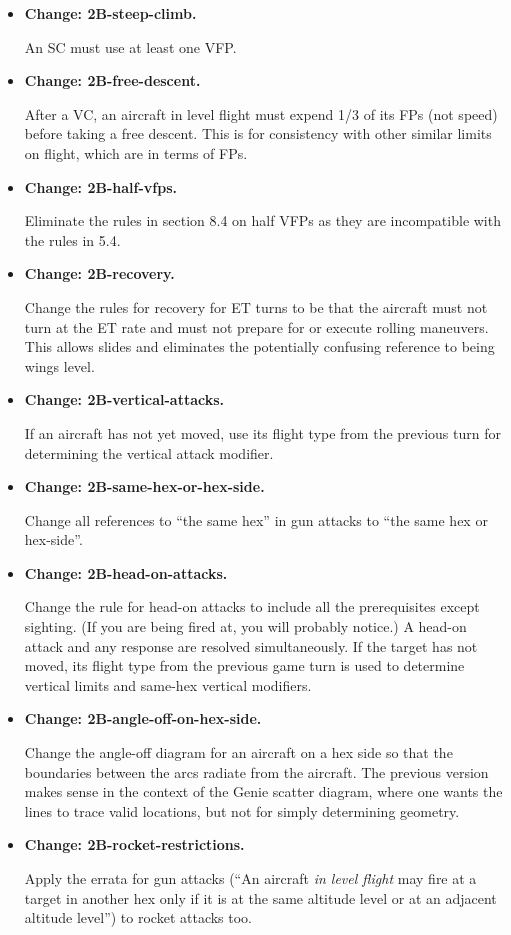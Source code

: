 \documentclass[10pt]{report}
\newcommand{\itemtag}[1]{\item \textbf{Change: #1.}\par}
\begin{document}
\begin{itemize}
    \itemtag{2B-steep-climb} An SC must use at least one VFP.


    \itemtag{2B-free-descent} After a VC, an aircraft in level flight must expend 1/3 of its FPs (not speed) before taking a free descent. This is for consistency with other similar limits on flight, which are in terms of FPs.

    \itemtag{2B-half-vfps} Eliminate the rules in section 8.4 on half VFPs as they are incompatible with the rules in 5.4.
    
    \itemtag{2B-recovery} Change the rules for recovery for ET turns to be that the aircraft must not turn at the ET rate and must not prepare for or execute rolling maneuvers. This allows slides and eliminates the potentially confusing reference to being wings level.

    \itemtag{2B-vertical-attacks} If an aircraft has not yet moved, use its flight type from the previous turn for determining the vertical attack modifier.
    
    \itemtag{2B-same-hex-or-hex-side} Change all references to “the same hex” in gun attacks to “the same hex or hex-side”.

    \itemtag{2B-head-on-attacks} Change the rule for head-on attacks to include all the prerequisites except sighting. (If you are being fired at, you will probably notice.) A head-on attack and any response are resolved simultaneously. If the target has not moved, its flight type from the previous game turn is used to determine vertical limits and same-hex vertical modifiers.

    \itemtag{2B-angle-off-on-hex-side} Change the angle-off diagram for an aircraft on a hex side so that the boundaries between the arcs radiate from the aircraft. The previous version makes sense in the context of the Genie scatter diagram, where one wants the lines to trace valid locations, but not for simply determining geometry.

    \itemtag{2B-rocket-restrictions} Apply the errata for gun attacks (“An aircraft \emph{in level flight} may fire at a target in another hex only if it is at the same altitude level or at an adjacent altitude level”) to rocket attacks too.


\end{itemize}
\end{document}
